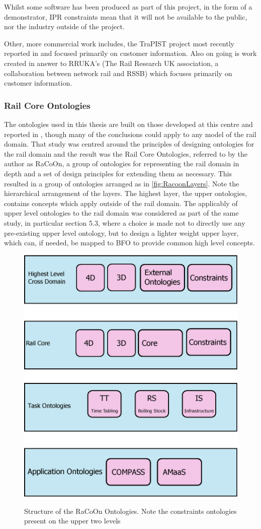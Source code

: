 Whilst some software has been produced as part of this project, in the form of a demonstrator, IPR constraints mean that it will not be available to the public, nor the industry outside of the project.

Other, more commercial work includes, the TraPIST project most recently reported in \citet{Bhatti2016} and focused primarily on customer information. Also on going is work created in answer to RRUKA's (The Rail Research UK association, a collaboration between network rail and RSSB)  which focuses primarily on customer information.

\subsubsection{Rail Core Ontologies}
\label{sec:racoon}
The ontologies used in this thesis are built on those developed at this centre and reported in \citet{Tutcher2015}, though many of the conclusions could apply to any model of the rail domain. That study was centred around the principles of designing ontologies for the rail domain and the result was the Rail Core Ontologies, referred to by the author as RaCoOn, a group of ontologies for representing the rail domain in depth and a set of design principles for extending them as necessary. This resulted in a group of ontologies arranged as in \autoref{fig:RacoonLayers}. Note the hierarchical arrangement of the layers. The highest layer, the upper ontologies, contains concepts which apply outside of the rail domain. The applicably of upper level ontologies to the rail domain was considered as part of the same study, in particular section 5.3, where a choice is made not to directly use any pre-existing upper level ontology, but to design a lighter weight upper layer, which can, if needed, be mapped to BFO to provide common high level concepts.

\begin{figure}[htb]
\myfloatalign
{\includegraphics[width=0.6\linewidth,keepaspectratio]{gfx/RacoonLayers}}  
\caption[Racoon Layers]{Structure of the RaCoOn Ontologies. Note the constraints ontologies present on the upper two levels}
\label{fig:RacoonLayers}
\end{figure}

